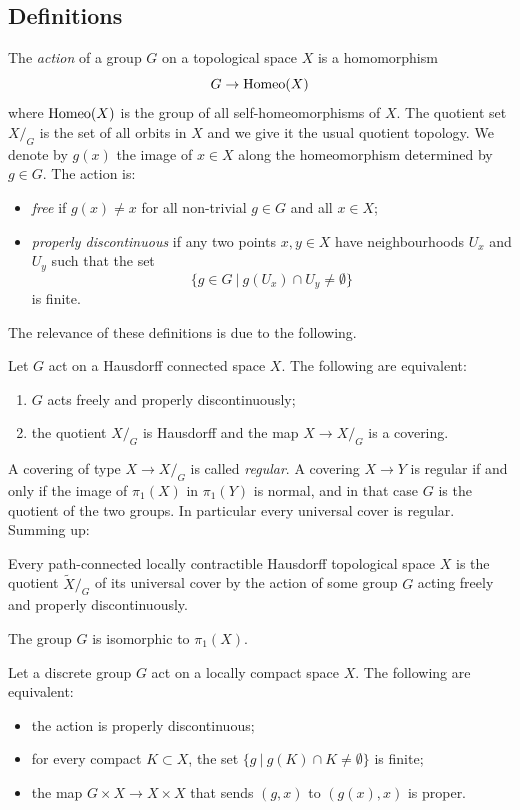 \subsection{Definitions}
The \emph{action} of a group $G$ on a topological space $X$ is a homomorphism 
$$G\to {\rm Homeo} (X)$$ 
where ${\rm Homeo}(X)$ is the group of all self-homeomorphisms of $X$. The quotient set $X/_G$ is the set of all orbits in $X$ and we give it the usual quotient topology. We denote by $g(x)$ the image of $x\in X$ along the homeomorphism determined by $g\in G$. The action is:
\begin{itemize}
\item \emph{free} if $g(x) \neq x$ for all non-trivial $g\in G$ and all $x\in X$;
\item \emph{properly discontinuous} if any two points $x,y \in X$ have neighbourhoods $U_x$ and $U_y$ such that the set
$$\big\{g \in G\ \big|\ g(U_x) \cap U_y \neq \emptyset \big\}$$
is finite.
\end{itemize}
The relevance of these definitions is due to the following.
\begin{prop} \label{equivalent:prop}
Let $G$ act on a Hausdorff connected space $X$. The following are equivalent:
\begin{enumerate}
\item $G$ acts freely and properly discontinuously;
\item the quotient $X/_G$ is Hausdorff and the map $X \to X/_G$ is a covering.
\end{enumerate}
\end{prop}

A covering of type $X \to X/_G$ is called \emph{regular}. A covering $X \to Y$ is regular if and only if the image of $\pi_1(X)$ in $\pi_1(Y)$ is normal, and in that case $G$ is the quotient of the two groups. In particular every universal cover is regular.
Summing up:

\begin{cor} \label{XG:cor}
Every path-connected locally contractible Hausdorff topological space $X$ is the quotient $\tilde X/_G$ of its universal cover by the action of some group $G$ acting freely and properly discontinuously.
\end{cor}

The group $G$ is isomorphic to $\pi_1(X)$.

\begin{ex} \label{proper:ex}
Let a discrete group $G$ act on a locally compact space $X$. The following are equivalent:
\begin{itemize}
\item the action is properly discontinuous; 
\item for every compact $K\subset X$, the set $\big\{g\ |\ g(K) \cap K \neq \emptyset\big\}$ is finite; \item the map 
$ G \times X \to X \times X$ that sends $(g,x)$ to $(g(x), x)$ is proper.
\end{itemize}
\end{ex}

